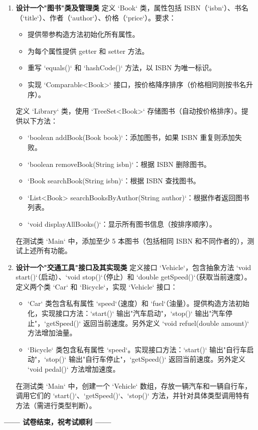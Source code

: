 \documentclass[a3paper, landscape, 11pt, twocolumn]{article}
\begin{document}
\begin{enumerate}[leftmargin=*, label=\arabic*., itemsep=1em]
	\item \textbf{设计一个"图书"类及管理类}
	      定义 `Book` 类，属性包括 ISBN（`isbn`）、书名（`title`）、作者（`author`）、价格（`price`）。要求：
	      \begin{itemize}
		      \item 提供带参构造方法初始化所有属性。
		      \item 为每个属性提供 getter 和 setter 方法。
		      \item 重写 `equals()` 和 `hashCode()` 方法，以 ISBN 为唯一标识。
		      \item 实现 `Comparable<Book>` 接口，按价格降序排序（价格相同则按书名升序）。
	      \end{itemize}
	      定义 `Library` 类，使用 `TreeSet<Book>` 存储图书（自动按价格排序）。提供以下方法：
	      \begin{itemize}
		      \item `boolean addBook(Book book)`：添加图书，如果 ISBN 重复则添加失败。
		      \item `boolean removeBook(String isbn)`：根据 ISBN 删除图书。
		      \item `Book searchBook(String isbn)`：根据 ISBN 查找图书。
		      \item `List<Book> searchBooksByAuthor(String author)`：根据作者返回图书列表。
		      \item `void displayAllBooks()`：显示所有图书信息（按排序顺序）。
	      \end{itemize}
	      在测试类 `Main` 中，添加至少 5 本图书（包括相同 ISBN 和不同作者的），测试上述所有功能。

	\item \textbf{设计一个"交通工具"接口及其实现类}
	      定义接口 `Vehicle`，包含抽象方法 `void start()`（启动）、`void stop()`（停止）和 `double getSpeed()`（获取当前速度）。\\
	      定义两个类 `Car` 和 `Bicycle`，实现 `Vehicle` 接口：
	      \begin{itemize}
		      \item `Car` 类包含私有属性 `speed`（速度）和 `fuel`（油量）。提供构造方法初始化，实现接口方法：`start()` 输出"汽车启动"，`stop()` 输出"汽车停止"，`getSpeed()` 返回当前速度。另外定义 `void refuel(double amount)` 方法增加油量。
		      \item `Bicycle` 类包含私有属性 `speed`。实现接口方法：`start()` 输出"自行车启动"，`stop()` 输出"自行车停止"，`getSpeed()` 返回当前速度。另外定义 `void pedal()` 方法增加速度。
	      \end{itemize}
	      在测试类 `Main` 中，创建一个 `Vehicle` 数组，存放一辆汽车和一辆自行车，调用它们的 `start()`、`getSpeed()`、`stop()` 方法，并针对具体类型调用特有方法（需进行类型判断）。
\end{enumerate}

\vfill

\begin{center}
	\bfseries —— 试卷结束，祝考试顺利 ——
\end{center}
\end{document}
